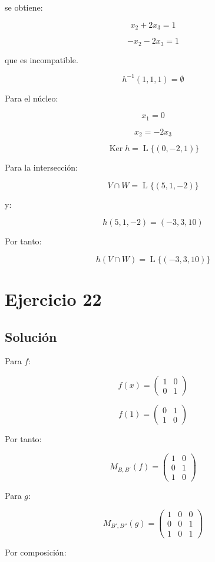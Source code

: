 \documentclass[11pt,a4paper]{article}
\newcommand{\Ker}{\operatorname{Ker}}
\newcommand{\Span}{\operatorname{L}}
\begin{document}
	se obtiene:

	\[
	x_2+2x_3=1
	\]

	\[
	-x_2-2x_3=1
	\]

	que es incompatible.

	\[
	\boxed{
	h^{-1}(1,1,1)=\emptyset
	}
	\]

	Para el núcleo:

	\[
	x_1=0
	\]

	\[
	x_2=-2x_3
	\]

	\[
	\boxed{
	\Ker h
	=
	\Span\{(0,-2,1)\}
	}
	\]

	Para la intersección:

	\[
	V\cap W
	=
	\Span\{(5,1,-2)\}
	\]

	y:

	\[
	h(5,1,-2)=(-3,3,10)
	\]

	Por tanto:

	\[
	\boxed{
	h(V\cap W)
	=
	\Span\{(-3,3,10)\}
	}
	\]

\section{Ejercicio 22}
	\subsection{Solución}

	Para $f$:

	\[
	f(x)
	=
	\begin{pmatrix}
	1&0\\
	0&1
	\end{pmatrix}
	\]

	\[
	f(1)
	=
	\begin{pmatrix}
	0&1\\
	1&0
	\end{pmatrix}
	\]

	Por tanto:

	\[
	\boxed{
	M_{B,B'}(f)
	=
	\begin{pmatrix}
	1&0\\
	0&1\\
	1&0
	\end{pmatrix}
	}
	\]

	Para $g$:

	\[
	\boxed{
	M_{B',B''}(g)
	=
	\begin{pmatrix}
	1&0&0\\
	0&0&1\\
	1&0&1
	\end{pmatrix}
	}
	\]

	Por composición:
\end{document}
